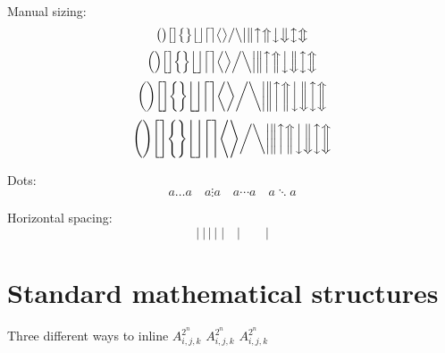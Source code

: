 Manual sizing:
\begin{dmath}[compact,spread={1.250000\baselineskip}] \big( \big) \big[ \big] \big\{ \big\} \big\lfloor \big\rfloor \big\lceil \big\rceil \big\langle \big\rangle  \big/ \big\backslash \big| \big\| \big\uparrow \big\Uparrow \big\downarrow \big\Downarrow \big\updownarrow \big\Updownarrow \end{dmath}
\begin{dmath}[compact,spread={1.250000\baselineskip}] \Big( \Big) \Big[ \Big] \Big\{ \Big\} \Big\lfloor \Big\rfloor \Big\lceil \Big\rceil \Big\langle \Big\rangle  \Big/ \Big\backslash \Big| \Big\| \Big\uparrow \Big\Uparrow \Big\downarrow \Big\Downarrow \Big\updownarrow \Big\Updownarrow \end{dmath}
\begin{dmath}[compact,spread={1.250000\baselineskip}] \bigg( \bigg) \bigg[ \bigg] \bigg\{ \bigg\} \bigg\lfloor \bigg\rfloor \bigg\lceil \bigg\rceil \bigg\langle \bigg\rangle  \bigg/ \bigg\backslash \bigg| \bigg\| \bigg\uparrow \bigg\Uparrow \bigg\downarrow \bigg\Downarrow \bigg\updownarrow \bigg\Updownarrow \end{dmath}
\begin{dmath}[compact,spread={1.250000\baselineskip}] \Bigg( \Bigg) \Bigg[ \Bigg] \Bigg\{ \Bigg\} \Bigg\lfloor \Bigg\rfloor \Bigg\lceil \Bigg\rceil \Bigg\langle \Bigg\rangle  \bigg/ \bigg\backslash \bigg| \bigg\| \bigg\uparrow \bigg\Uparrow \bigg\downarrow \bigg\Downarrow \bigg\updownarrow \bigg\Updownarrow \end{dmath}

Dots:
\begin{dmath}[compact,spread={1.250000\baselineskip}] a \ldots a \quad a \vdots a \quad  a \cdots a \quad  a \ddots a \end{dmath}

Horizontal spacing:
\begin{dmath}[compact,spread={1.250000\baselineskip}] |~|\,|\:|\;|\quad | \qquad | \end{dmath}%

\section{Standard mathematical structures}

Three different ways to inline \begin{math}A_{i,j,k}^{2^n}\end{math} \(A_{i,j,k}^{2^n}\) \(A_{i,j,k}^{2^n}\)

